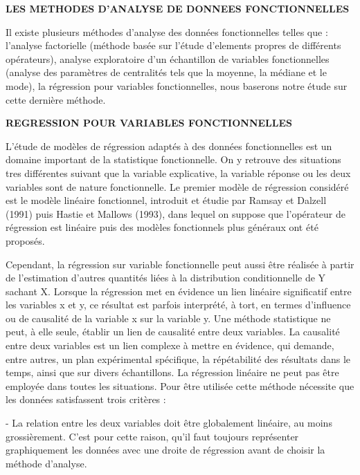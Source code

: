 \documentclass[12pt,a4paper]{article}
\begin{document}
\begin{center}
\textbf{LES METHODES D’ANALYSE DE DONNEES FONCTIONNELLES}
\end{center}

Il existe plusieurs méthodes d’analyse des données fonctionnelles telles que : l’analyse factorielle (méthode basée sur l’étude d’elements propres de différents opérateurs), analyse exploratoire d’un échantillon de variables fonctionnelles (analyse des paramètres de centralités tels que la moyenne, la médiane et le mode), la régression pour variables fonctionnelles, nous baserons notre étude sur cette dernière méthode. 

\begin{center}
\textbf{REGRESSION POUR VARIABLES FONCTIONNELLES}
\end{center}

L'étude de modèles de régression adaptés à des données fonctionnelles est un domaine important de la statistique fonctionnelle. On y retrouve des situations tres différentes suivant que la variable explicative, la variable réponse ou les deux variables sont de nature fonctionnelle.
Le premier modèle de régression considéré est le modèle linéaire fonctionnel, introduit et étudie par Ramsay et Dalzell (1991) puis Hastie et Mallows (1993), dans lequel on suppose que l’opérateur de régression est linéaire puis des modèles fonctionnels plus généraux ont été proposés. 


Cependant, la régression sur variable fonctionnelle peut aussi être réalisée à partir de l’estimation d’autres quantités liées à la distribution conditionnelle de Y sachant X.
Lorsque la régression met en évidence un lien linéaire significatif entre les variables x et y, ce résultat est parfois interprété, à tort, en termes d’influence ou de causalité de la variable x sur la variable y. Une méthode statistique ne peut, à elle seule, établir un lien de causalité entre deux variables. La causalité entre deux variables est un lien complexe à mettre en évidence, qui demande, entre autres, un plan expérimental spécifique, la répétabilité des résultats dans le temps, ainsi que sur divers échantillons. 
La régression linéaire ne peut pas être employée dans toutes les situations. Pour être utilisée cette méthode nécessite que les données satisfassent trois critères :

-	La relation entre les deux variables doit être globalement linéaire, au moins grossièrement. C’est pour cette raison, qu’il faut toujours représenter graphiquement les données avec une droite de régression avant de choisir la méthode d’analyse.
\end{document}
